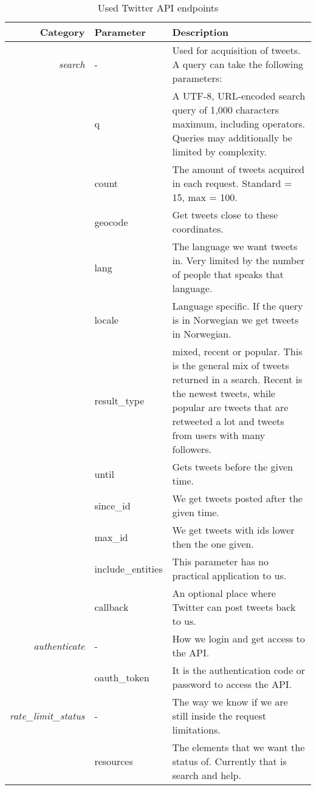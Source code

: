 \begin{table}
\centering
\label{tbl:twitterAPIendpoints}
\caption{Used Twitter API endpoints}
\begin{tabular}{ r l | p{7cm} }
Category & Parameter & Description\\
\hline

\textit{search} & - & Used for acquisition of tweets. A query can take the
following parameters: \\
& q & A UTF-8, URL-encoded search query of 1,000 characters maximum,
including operators. Queries may additionally be limited by complexity. \\
& count & The amount of tweets acquired in each request. Standard =
15, max = 100. \\
& geocode & Get tweets close to these coordinates. \\
& lang & The language we want tweets in. Very limited by the number of people that speaks that language. \\
& locale & Language specific. If the query is in Norwegian we get tweets in Norwegian.\\
& result\_type & mixed, recent or popular. This is the general mix of tweets
returned in a search. Recent is the newest tweets, while popular are tweets that
are retweeted a lot and tweets from users with many followers. \\
& until & Gets tweets before the given time. \\
& since\_id & We get tweets posted after the given time. \\
& max\_id & We get tweets with ids lower then the one given. \\
& include\_entities & This parameter has no practical application to us. \\
& callback & An optional place where Twitter can post tweets back to us. \\

\hline
\textit{authenticate} & - & How we login and get access to the API. \\
& oauth\_token & It is the authentication code or password to access
the API. \\

\hline
\textit{rate\_limit\_status} & - & The way we know if we are still inside
the request limitations. \\
& resources & The elements that we want the status of. Currently that
is search and help. \\ 

\end{tabular}
\end{table}
%

